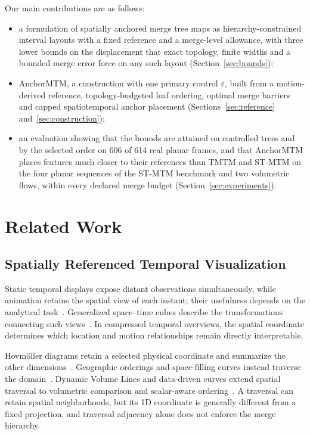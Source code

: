 \documentclass[review]{vgtc}
\begin{document}
Our main contributions are as follows:
\begin{itemize}
\setlength{\itemsep}{2pt}
\setlength{\parsep}{0pt}
\item a formulation of spatially anchored merge tree maps as hierarchy-constrained interval layouts with a fixed reference and a merge-level allowance, with three lower bounds on the displacement that exact topology, finite widths and a bounded merge error force on any such layout (Section~\ref{sec:bounds});
\item AnchorMTM, a construction with one primary control $\varepsilon$, built from a motion-derived reference, topology-budgeted leaf ordering, optimal merge barriers and capped spatiotemporal anchor placement (Sections~\ref{sec:reference} and~\ref{sec:construction});
\item an evaluation showing that the bounds are attained on controlled trees and by the selected order on 606 of 614 real planar frames, and that AnchorMTM places features much closer to their references than TMTM and ST-MTM on the four planar sequences of the ST-MTM benchmark and two volumetric flows, within every declared merge budget (Section~\ref{sec:experiments}).
\end{itemize}



\section{Related Work}\label{sec:related}
\subsection{Spatially Referenced Temporal Visualization}
Static temporal displays expose distant observations simultaneously, while animation retains the spatial view of each instant; their usefulness depends on the analytical task~\cite{Tversky:2002:Animation,Robertson:2008:Animation}. Generalized space--time cubes describe the transformations connecting such views~\cite{Bach:2017:STC}. In compressed temporal overviews, the spatial coordinate determines which location and motion relationships remain directly interpretable.

Hovm\"oller diagrams retain a selected physical coordinate and summarize the other dimensions~\cite{Hovmoller:1949}. Geographic orderings and space-filling curves instead traverse the domain~\cite{Guo:2006:SpatialOrder,Dafner:2000:CSFC}. Dynamic Volume Lines and data-driven curves extend spatial traversal to volumetric comparison and scalar-aware ordering~\cite{Weissenboeck:2019:DVL,Zhou:2021:DSF}. A traversal can retain spatial neighborhoods, but its 1D coordinate is generally different from a fixed projection, and traversal adjacency alone does not enforce the merge hierarchy.
\end{document}
